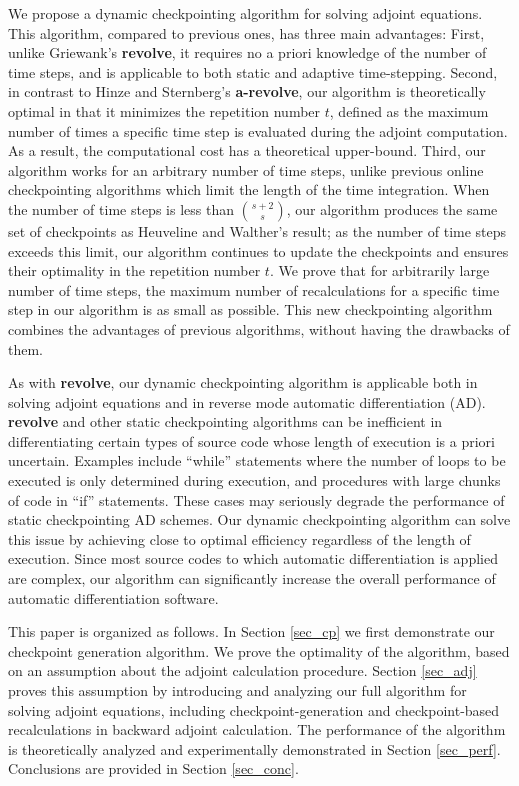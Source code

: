 \documentclass[oneeqnum, onethmnum, onefignum, onetabnum]{siamltex}
\begin{document}
We propose a dynamic checkpointing algorithm for solving adjoint equations.
This algorithm, compared to previous ones, has three main advantages: First,
unlike Griewank's {\bf revolve}, it requires no a priori knowledge of the number
of time steps, and is applicable to both static and adaptive time-stepping.
Second, in contrast to Hinze and Sternberg's {\bf a-revolve}, our algorithm
is theoretically optimal in that it minimizes the repetition number $t$,
defined as the maximum number of times a specific time step is evaluated during
the adjoint computation.  As a result, the computational cost has a theoretical
upper-bound.  Third, our
algorithm works for an arbitrary number of time steps, unlike previous online
checkpointing algorithms which limit the
length of the time integration.  When the number of time steps is less than
$\binom{s + 2}{s}$, our algorithm produces the same set of
checkpoints as Heuveline and Walther's result; as the number of time steps
exceeds this limit, our algorithm continues to update the checkpoints and
ensures their optimality in the repetition number $t$.  We prove that for
arbitrarily large number of time steps, the maximum number of recalculations
for a specific time step in our algorithm is as small as possible.  This new
checkpointing algorithm combines the advantages of previous algorithms,
without having the drawbacks of them.

As with {\bf revolve}, our dynamic checkpointing algorithm is applicable both
in solving adjoint equations and in reverse mode automatic differentiation (AD).
{\bf revolve} and other static checkpointing algorithms can be inefficient in
differentiating
certain types of source code whose length of execution is a priori uncertain.
Examples include ``while'' statements where the number of loops to be
executed is only determined during execution, and procedures with large chunks
of code in ``if'' statements.  These cases may seriously degrade the
performance of static checkpointing AD schemes.  Our dynamic checkpointing
algorithm can solve this issue by achieving close to optimal efficiency
regardless of the length of execution.  Since most source codes to which
automatic differentiation is applied are complex, our algorithm
can significantly increase the overall performance of automatic differentiation
software.

This paper is organized as follows.  In Section \ref{sec_cp}
we first demonstrate our checkpoint generation algorithm.  We prove the
optimality of the algorithm, based on an assumption about the adjoint
calculation procedure.  Section \ref{sec_adj} proves this assumption by
introducing and analyzing our full algorithm for solving adjoint equations,
including checkpoint-generation and checkpoint-based recalculations in
backward adjoint calculation.  The performance of the algorithm is theoretically
analyzed and experimentally demonstrated in Section \ref{sec_perf}.
Conclusions are provided in Section \ref{sec_conc}.
\end{document}
